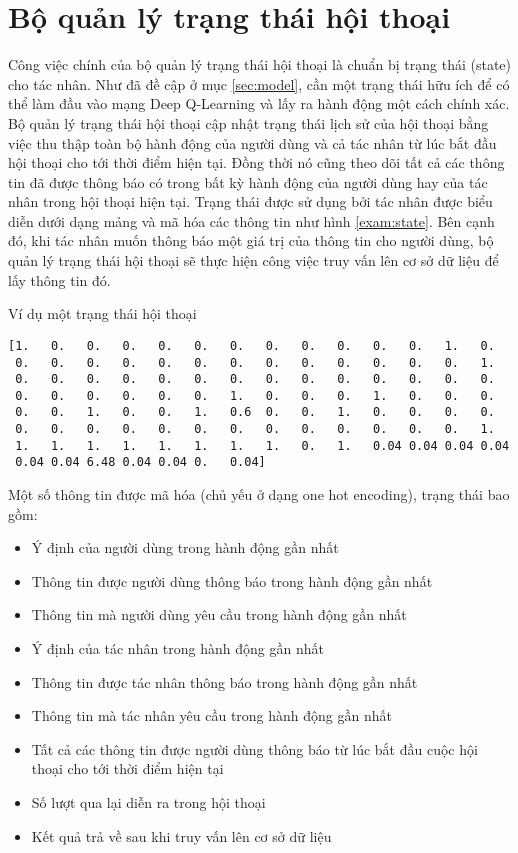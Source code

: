 \section{Bộ quản lý trạng thái hội thoại}
\label{sec:statetracker}
Công việc chính của bộ quản lý trạng thái hội thoại là chuẩn bị
trạng thái (state) cho tác nhân. Như đã đề cập ở mục \ref{sec:model},
cần một trạng thái hữu ích để có thể làm đầu vào mạng Deep Q-Learning
và lấy ra hành động một cách chính xác. Bộ quản lý trạng thái hội thoại
cập nhật trạng thái lịch sử của hội thoại bằng việc thu thập toàn bộ
hành động của người dùng và cả tác nhân từ lúc bắt đầu hội thoại cho tới
thời điểm hiện tại. Đồng thời nó cũng theo dõi tất cả các thông tin
đã được thông báo có trong bất kỳ hành động của người dùng hay của
tác nhân trong hội thoại hiện tại. Trạng thái được sử dụng bởi tác nhân
được biểu diễn dưới dạng mảng và mã hóa các thông tin như hình
\ref{exam:state}. Bên cạnh đó, khi tác nhân muốn thông báo một giá trị
của thông tin cho người dùng, bộ quản lý trạng thái hội thoại sẽ
thực hiện công việc truy vấn lên cơ sở dữ liệu để lấy thông tin đó.

\renewcommand{\textboxenvname}{Ví dụ}
\begin{textbox}{Ví dụ một trạng thái hội thoại}
\begin{Verbatim}[breaklines=true, breakanywhere=true]
[1.   0.   0.   0.   0.   0.   0.   0.   0.   0.   0.   0.   1.   0.
 0.   0.   0.   0.   0.   0.   0.   0.   0.   0.   0.   0.   0.   1.
 0.   0.   0.   0.   0.   0.   0.   0.   0.   0.   0.   0.   0.   0.
 0.   0.   0.   0.   0.   0.   1.   0.   0.   0.   1.   0.   0.   0.
 0.   0.   1.   0.   0.   1.   0.6  0.   0.   1.   0.   0.   0.   0.
 0.   0.   0.   0.   0.   0.   0.   0.   0.   0.   0.   0.   0.   1.
 1.   1.   1.   1.   1.   1.   1.   1.   0.   1.   0.04 0.04 0.04 0.04
 0.04 0.04 6.48 0.04 0.04 0.   0.04]
\end{Verbatim}
\end{textbox}

Một số thông tin được mã hóa (chủ yếu ở dạng one hot encoding),
trạng thái bao gồm:

\begin{itemize}
    \item Ý định của người dùng trong hành động gần nhất
    \item Thông tin được người dùng thông báo trong hành động gần nhất
    \item Thông tin mà người dùng yêu cầu trong hành động gần nhất
    \item Ý định của tác nhân trong hành động gần nhất
    \item Thông tin được tác nhân thông báo trong hành động gần nhất
    \item Thông tin mà tác nhân yêu cầu trong hành động gần nhất
    \item Tất cả các thông tin được người dùng thông báo từ lúc bắt đầu
    cuộc hội thoại cho tới thời điểm hiện tại
    \item Số lượt qua lại diễn ra trong hội thoại
    \item Kết quả trả về sau khi truy vấn lên cơ sở dữ liệu
\end{itemize}

